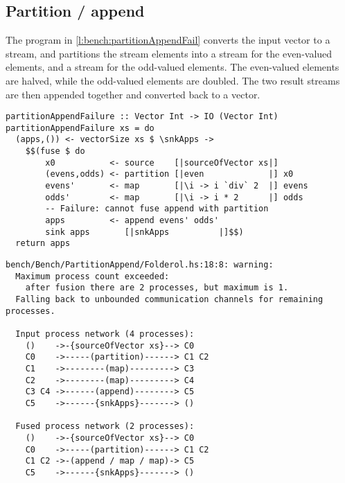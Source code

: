 \subsection{Partition / append}
\label{s:Benchmarks:partitionAppend}

The program in \cref{l:bench:partitionAppendFail} converts the input vector to a stream, and partitions the stream elements into a stream for the even-valued elements, and a stream for the odd-valued elements.
The even-valued elements are halved, while the odd-valued elements are doubled.
The two result streams are then appended together and converted back to a vector.

\begin{lstlisting}[float,label=l:bench:partitionAppendFail,caption=Partition / append fusion failure]
partitionAppendFailure :: Vector Int -> IO (Vector Int)
partitionAppendFailure xs = do
  (apps,()) <- vectorSize xs $ \snkApps ->
    $$(fuse $ do
        x0           <- source    [|sourceOfVector xs|]
        (evens,odds) <- partition [|even             |] x0
        evens'       <- map       [|\i -> i `div` 2  |] evens
        odds'        <- map       [|\i -> i * 2      |] odds
        -- Failure: cannot fuse append with partition
        apps         <- append evens' odds'
        sink apps       [|snkApps          |]$$)
  return apps
\end{lstlisting}


\begin{lstlisting}[float,language=nil,label=l:bench:partitionAppendWarning,caption=Partition / append fusion failure compile-time warning]
bench/Bench/PartitionAppend/Folderol.hs:18:8: warning:
  Maximum process count exceeded:
    after fusion there are 2 processes, but maximum is 1.
  Falling back to unbounded communication channels for remaining processes.

  Input process network (4 processes):
    ()    ->-{sourceOfVector xs}--> C0
    C0    ->-----(partition)------> C1 C2
    C1    ->--------(map)---------> C3
    C2    ->--------(map)---------> C4
    C3 C4 ->------(append)--------> C5
    C5    ->------{snkApps}-------> ()
  
  Fused process network (2 processes):
    ()    ->-{sourceOfVector xs}--> C0
    C0    ->-----(partition)------> C1 C2
    C1 C2 ->-(append / map / map)-> C5
    C5    ->------{snkApps}-------> ()
\end{lstlisting}

